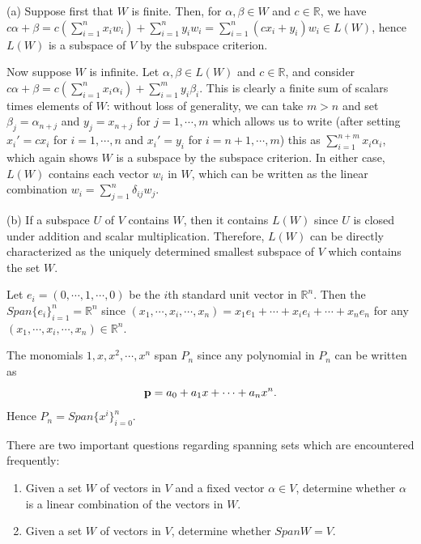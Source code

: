 \documentclass[12pt,letterpaper,reqno]{article}
\numberwithin{equation}{section}
\begin{document}
\begin{pf}
(a) Suppose first that $W$ is finite. Then, for $\alpha,\beta \in W$ and $c \in \mathbb{R}$, we have $c\alpha+\beta =c(\sum_{i=1}^nx_iw_i)+\sum_{i=1}^ny_iw_i=\sum_{i=1}^n(cx_i+y_i)w_i \in L(W)$, hence $L(W)$ is a subspace of $V$ by the subspace criterion.

Now suppose $W$ is infinite. Let $\alpha,\beta \in L(W)$ and $c \in \mathbb{R}$, and consider $c\alpha+\beta=c(\sum_{i=1}^n x_i\alpha_i)+\sum_{i=1}^m y_i \beta_i$. This is clearly a finite sum of scalars times elements of $W$: without loss of generality, we can take $m>n$ and set $\beta_j=\alpha_{n+j}$ and $y_j=x_{n+j}$ for $j=1,\cdots,m$ which allows us to write (after setting $x_i'=cx_i$ for $i=1,\cdots,n$ and $x_i'=y_i$ for $i=n+1,\cdots,m$) this as $\sum_{i=1}^{n+m}x_i\alpha_i$, which again shows $W$ is a subspace by the subspace criterion. In either case, $L(W)$ contains each vector $w_i$ in $W$, which can be written as the linear combination $w_i=\sum_{j=1}^n \delta_{ij}w_j$. 

(b) If a subspace $U$ of $V$ contains $W$, then it contains $L(W)$ since $U$ is closed under addition and scalar multiplication. Therefore, $L(W)$ can be directly characterized as the uniquely determined smallest subspace of $V$ which contains the set $W$.	
\end{pf}

\begin{example}
	Let $e_i=(0,\cdots,1,\cdots,0)$ be the $i$th standard unit vector in $\mathbb{R}^n$. Then the $Span\{e_i\}_{i=1}^n=\mathbb{R}^n$ since $(x_1,\cdots,x_i,\cdots,x_n)=x_1e_1+\cdots+x_ie_i+\cdots+x_ne_n$ for any $(x_1,\cdots,x_i,\cdots,x_n) \in \mathbb{R}^n$.
\end{example}

\begin{example}
	The monomials $1,x,x^2,\cdots,x^n$ span $P_n$ since any polynomial in $P_n$ can be written as
$${\bf p}=a_0+a_1x+\cdots+a_nx^n.$$
Hence $P_n=Span\{x^i\}_{i=0}^n$.
\end{example}

There are two important questions regarding spanning sets which are encountered frequently:
\begin{enumerate}
	\item Given a set $W$ of vectors in $V$ and a fixed vector $\alpha \in V$, determine whether $\alpha$ is a linear combination of the vectors in $W$.
	\item Given a set $W$ of vectors in $V$, determine whether $SpanW=V$. \\
\end{enumerate}
\end{document}
